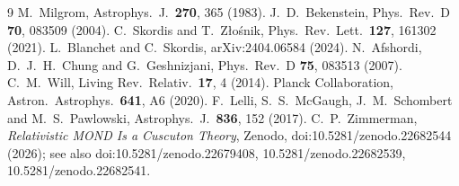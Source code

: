 \documentclass[11pt,letterpaper]{article}
\begin{document}
\begin{thebibliography}{9}
 M.~Milgrom, Astrophys.\ J.\ \textbf{270}, 365 (1983).
 J.~D.~Bekenstein, Phys.\ Rev.\ D \textbf{70}, 083509 (2004).
 C.~Skordis and T.~Z\l o\'snik, Phys.\ Rev.\ Lett.\ \textbf{127}, 161302 (2021).
 L.~Blanchet and C.~Skordis, arXiv:2404.06584 (2024).
 N.~Afshordi, D.~J.~H.~Chung and G.~Geshnizjani, Phys.\ Rev.\ D \textbf{75}, 083513 (2007).
 C.~M.~Will, Living Rev.\ Relativ.\ \textbf{17}, 4 (2014).
 Planck Collaboration, Astron.\ Astrophys.\ \textbf{641}, A6 (2020).
 F.~Lelli, S.~S.~McGaugh, J.~M.~Schombert and M.~S.~Pawlowski, Astrophys.\ J.\ \textbf{836}, 152 (2017).
 C.~P.~Zimmerman, \emph{Relativistic MOND Is a Cuscuton Theory}, Zenodo, doi:10.5281/zenodo.22682544 (2026); see also doi:10.5281/zenodo.22679408, 10.5281/zenodo.22682539, 10.5281/zenodo.22682541.
\end{thebibliography}
\end{document}
